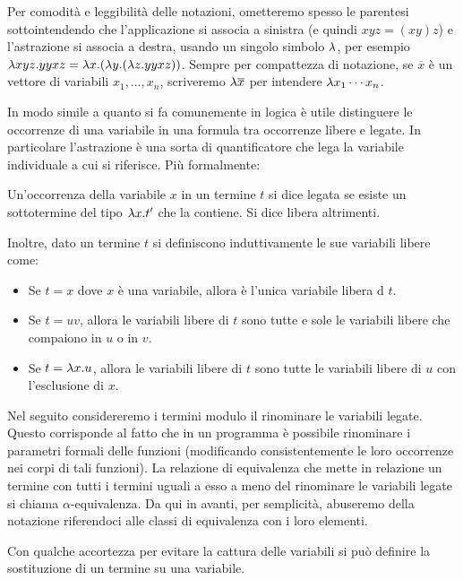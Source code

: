\documentclass[]{marticle}
\begin{document}
Per comodit\`a e leggibilit\`a delle notazioni, ometteremo spesso le parentesi
sottointendendo che l'applicazione si associa a sinistra (e quindi $xyz=(xy)z$)
e l'astrazione si associa a destra, usando un singolo simbolo $\lambda$, per esempio
$\lambda xyz.yyxz = \lambda x. (\lambda y. (\lambda z. yyxz))$. Sempre per compattezza di notazione,
se $\overline{x}$ \`e un vettore di variabili $x_1,\dots,x_n$, scriveremo $\lambda
\overline{x}$ per intendere $\lambda x_1\cdots x_n$.

In modo simile a quanto si fa comunemente in logica \`e utile distinguere le
occorrenze di una variabile in una formula tra occorrenze libere e legate. In
particolare l'astrazione \`e una sorta di quantificatore che lega la variabile
individuale a cui si riferisce. Pi\`u formalmente:

\begin{block}[Definizione]
    Un'occorrenza della variabile $x$ in un termine $t$ si dice legata se esiste
    un sottotermine del tipo $\lambda x. t'$ che la contiene. Si dice libera
    altrimenti.

    Inoltre, dato un termine $t$ si definiscono induttivamente le sue variabili
    libere come:
    \begin{itemize}
        \item Se $t=x$ dove $x$ \`e una variabile, allora \`e l'unica variabile
            libera d $t$.
        \item Se $t=uv$, allora le variabili libere di $t$ sono tutte e sole le
            variabili libere che compaiono in $u$ o in $v$.
        \item Se $t=\lambda x. u$, allora le variabili libere di $t$ sono tutte le
            variabili libere di $u$ con l'esclusione di $x$.
    \end{itemize}
\end{block}

Nel seguito considereremo i termini modulo il rinominare le variabili legate.
Questo corrisponde al fatto che in un programma \`e possibile rinominare i
parametri formali delle funzioni (modificando consistentemente le loro
occorrenze nei corpi di tali funzioni). La relazione di equivalenza che mette in
relazione un termine con tutti i termini uguali a esso a meno del rinominare le
variabili legate si chiama $\alpha$-equivalenza. Da qui in avanti, per
semplicit\`a, abuseremo della notazione riferendoci alle classi di equivalenza
con i loro elementi.

Con qualche accortezza per evitare la cattura delle variabili si pu\`o definire
la sostituzione di un termine su una variabile.
\end{document}
